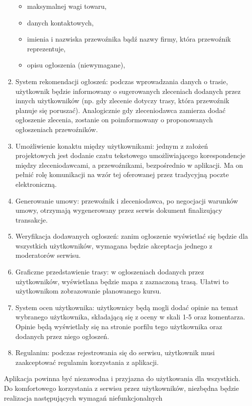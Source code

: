 \begin{enumerate}
\begin{itemize}
        \item maksymalnej wagi towaru,
        \item danych kontaktowych,
        \item imienia i nazwiska przewoźnika bądź nazwy firmy, która przewoźnik reprezentuje,
        \item opisu ogłoszenia (niewymagane),
    \end{itemize}
    \item System rekomendacji ogłoszeń: podczas wprowadzania danych o trasie, użytkownik będzie informowany o sugerowanych zleceniach dodanych przez innych użytkowników (np. gdy zlecenie dotyczy trasy, która przewoźnik planuje się poruszać). Analogicznie gdy zleceniodawca zamierza dodać ogłoszenie zlecenia, zostanie on poimformowany o proponowanych ogłoszeniach przewoźników.
    \item Umożliwienie konaktu między użytkownikami: jednym z założeń projektowych jest dodanie czatu tekstowego umożliwiającego korespondencje między zleceniodawcami, a przewoźnikami, bezpośrednio w aplikacji. Ma on pełnić rolę komunikacji na wzór tej  oferowanej przez tradycyjną poczte elektroniczną.
    \item Generowanie umowy: przewoźnik i zleceniodawca, po negocjacji warunków umowy, otrzymają wygenerowany przez serwis dokument finalizujący transakcje.
    \item Weryfikacja dodawanych ogłoszeń: zanim ogłoszenie wyświetlać się będzie dla wszystkich użytkowników, wymagana będzie akceptacja jednego z moderatorów serwisu.
    \item Graficzne przedstawienie trasy: w ogłoszeniach dodanych przez użytkowników, wyświetlana będzie mapa z zaznaczoną trasą. Ułatwi to użytkownikom zobrazowanie planowanego kursu.
    \item System ocen użytkownika: użytkownicy będą mogli dodać opinie na temat wybranego użytkownika, składającą się z oceny w skali 1-5 oraz komentarza. Opinie będą wyświetlały się na stronie porfilu tego użytkownika oraz dodanych przez niego ogłoszeń.
    \item Regulanim: podczas rejestrowania się do serwisu, użytkownik musi zaakceptować regulamin korzystania z aplikacji. 
\end{enumerate}
Aplikacja powinna być niezawodna i przyjazna do użytkowania dla wszystkich. Do komfortowego korzystania z serwisu przez użytkowników, niezbędna będzie realizacja następujących wymagań niefunkcjonalnych
